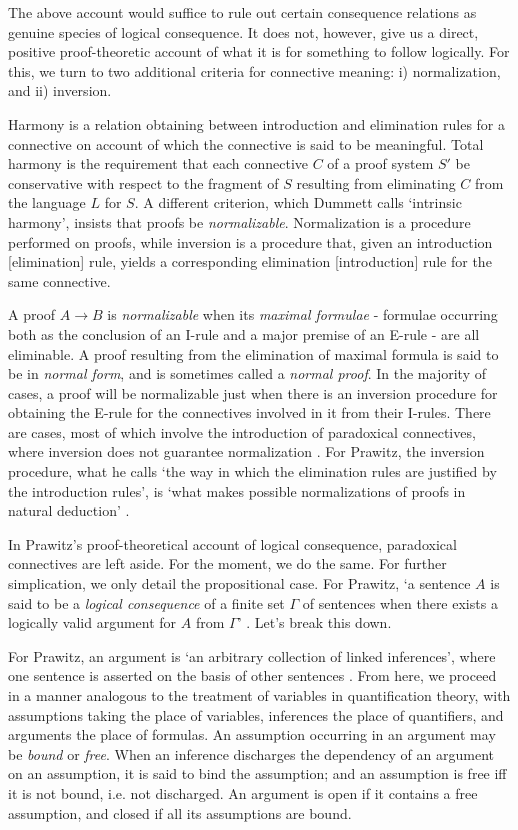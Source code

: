 	The above account would suffice to rule out certain consequence relations as genuine species of logical consequence. It does not, however, give us a direct, positive proof-theoretic account of what it is for something to follow logically. For this, we turn to two additional criteria for connective meaning: i) normalization, and ii) inversion. 
	
	Harmony is a relation obtaining between introduction and elimination rules for a connective on account of which the connective is said to be meaningful. Total harmony is the requirement that each connective $C$ of a proof system $S'$ be conservative with respect to the fragment of $S$ resulting from eliminating $C$ from the language $L$ for $S$. A different criterion, which Dummett calls `intrinsic harmony', insists that proofs be \textit{normalizable}. Normalization is a procedure performed on proofs, while inversion is a procedure that, given an introduction [elimination] rule, yields a corresponding elimination [introduction] rule for the same connective. 
	
	A proof $A \rightarrow B$ is \textit{normalizable} when its \textit{maximal formulae} - formulae occurring both as the conclusion of an I-rule and a major premise of an E-rule - are all eliminable. A proof resulting from the elimination of maximal formula is said to be in \textit{normal form}, and is sometimes called a \textit{normal proof}. In the majority of cases, a proof will be normalizable just when there is an inversion procedure for obtaining the E-rule for the connectives involved in it from their I-rules. There are cases, most of which involve the introduction of paradoxical connectives, where inversion does not guarantee normalization \cite{Read2010}. For Prawitz, the inversion procedure, what he calls `the way in which the elimination rules are justified by the introduction rules', is `what makes possible normalizations of proofs in natural deduction' \cite[160]{Prawitz1985}.
	
	In Prawitz's proof-theoretical account of logical consequence, paradoxical connectives are left aside. For the moment, we do the same. For further simplication, we only detail the propositional case. For Prawitz, `a sentence $A$ is said to be a \textit{logical consequence} of a finite set $\Gamma$ of sentences when there exists a logically valid argument for $A$ from $\Gamma$' \cite[166]{Prawitz1985}. Let's break this down. 
	
	For Prawitz, an argument is `an arbitrary collection of linked inferences', where one sentence is asserted on the basis of other sentences \cite[166]{Prawitz1985}. From here, we proceed in a manner analogous to the treatment of variables in quantification theory, with assumptions taking the place of variables, inferences the place of quantifiers, and arguments the place of formulas. An assumption occurring in an argument may be \textit{bound} or \textit{free}. When an inference discharges the dependency of an argument on an assumption, it is said to bind the assumption; and an assumption is free iff it is not bound, i.e. not discharged. An argument is open if it contains a free assumption, and closed if all its assumptions are bound.
	
